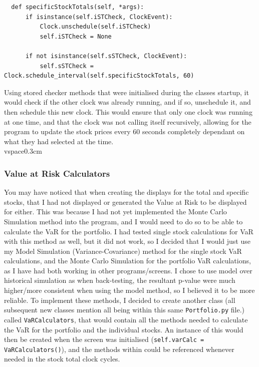 \documentclass{article}
\begin{document}
\begin{verbatim}
  def specificStockTotals(self, *args):
      if isinstance(self.iSTCheck, ClockEvent):
          Clock.unschedule(self.iSTCheck)
          self.iSTCheck = None

      if not isinstance(self.sSTCheck, ClockEvent):
          self.sSTCheck = Clock.schedule_interval(self.specificStockTotals, 60)
\end{verbatim}

\vspace{0.3cm}
Using stored checker methods that were initialised during the classes startup, it would check if the other clock was already running, and if so, unschedule it, and then schedule this new clock. This would ensure that only one clock was running at one time, and that the clock was not calling itself recursively, allowing for the program to update the stock prices every 60 seconds completely dependant on what they had selected at the time.\\vspace{0.3cm}

\subsubsection{Value at Risk Calculators}
You may have noticed that when creating the displays for the total and specific stocks, that I had not displayed or generated the Value at Risk to be displayed for either. This was because I had not yet implemented the Monte Carlo Simulation method into the program, and I would need to do so to be able to calculate the VaR for the portfolio. I had tested single stock calculations for VaR with this method as well, but it did not work, so I decided that I would just use my Model Simulation (Variance-Covariance) method for the single stock VaR calculations, and the Monte Carlo Simulation for the portfolio VaR calculations, as I have had both working in other programs/screens. I chose to use model over historical simulation as when back-testing, the resultant p-value were much higher/more consistent when using the model method, so I believed it to be more reliable. To implement these methods, I decided to create another class (all subsequent new classes mention all being within this same \texttt{Portfolio.py} file.) called \texttt{VaRCalculators}, that would contain all the methods needed to calculate the VaR for the portfolio and the individual stocks. An instance of this would then be created when the screen was initialised (\texttt{self.varCalc = VaRCalculators()}), and the methods within could be referenced  whenever needed in the stock total clock cycles.\\\vspace{0.3cm}
\end{document}
